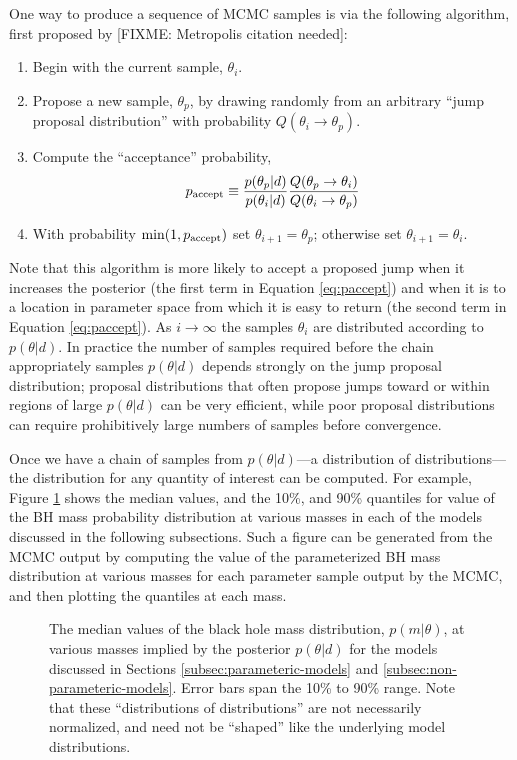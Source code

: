 \documentclass[preprint]{aastex}
\newcommand{\fixme}[1]{[FIXME: #1]}
\begin{document}
One way to produce a sequence of MCMC samples is via the following
algorithm, first proposed by \fixme{Metropolis citation needed}:
\begin{enumerate}
  \item Begin with the current sample, $\theta_i$.
  \item Propose a new sample, $\theta_p$, by drawing randomly from an
    arbitrary ``jump proposal distribution'' with probability
    $Q(\theta_i \to \theta_p)$.
  \item Compute the ``acceptance'' probability,
    \begin{equation}
      \label{eq:paccept}
      p_{\textnormal{accept}} \equiv
      \frac{p(\theta_p|d)}{p(\theta_i|d)} \frac{Q(\theta_p \to
        \theta_i)}{Q(\theta_i \to \theta_p)}
    \end{equation}
  \item With probability $\min(1,p_{\textnormal{accept}})$ set
    $\theta_{i+1} = \theta_p$; otherwise set $\theta_{i+1} =
    \theta_i$.
\end{enumerate}
Note that this algorithm is more likely to accept a proposed jump when
it increases the posterior (the first term in Equation
\eqref{eq:paccept}) and when it is to a location in parameter space
from which it is easy to return (the second term in Equation
\eqref{eq:paccept}).  As $i \to \infty$ the samples $\theta_i$ are
distributed according to $p(\theta|d)$.  In practice the number of
samples required before the chain appropriately samples $p(\theta|d)$
depends strongly on the jump proposal distribution; proposal
distributions that often propose jumps toward or within regions of
large $p(\theta|d)$ can be very efficient, while poor proposal
distributions can require prohibitively large numbers of samples
before convergence.  

Once we have a chain of samples from $p(\theta|d)$---a distribution of
distributions---the distribution for any quantity of interest can be
computed.  For example, Figure \ref{fig:dists} shows the median
values, and the 10\%, and 90\% quantiles for value of the BH mass
probability distribution at various masses in each of the models
discussed in the following subsections.  Such a figure can be
generated from the MCMC output by computing the value of the
parameterized BH mass distribution at various masses for each
parameter sample output by the MCMC, and then plotting the quantiles
at each mass.

\begin{figure}
  \begin{center}
  \end{center}
  \caption{\label{fig:dists} The median values of the black hole mass
    distribution, $p(m|\theta)$, at various masses implied by the
    posterior $p(\theta|d)$ for the models discussed in Sections
    \ref{subsec:parameteric-models} and
    \ref{subsec:non-parameteric-models}.  Error bars span the 10\% to
    90\% range.  Note that these ``distributions of distributions''
    are not necessarily normalized, and need not be ``shaped'' like
    the underlying model distributions.}
\end{figure}
\end{document}
